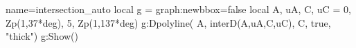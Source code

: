 \documentclass[border=5pt]{standalone}%
\begin{document}
\begin{luadraw}{name=intersection_auto}
local g = graph:new{bbox=false}
local A, uA, C, uC = 0, Zp(1,37*deg), 5, Zp(1,137*deg)
g:Dpolyline( {A, interD({A,uA},{C,uC}), C}, true, "thick")
g:Show()
\end{luadraw}
\end{document}
